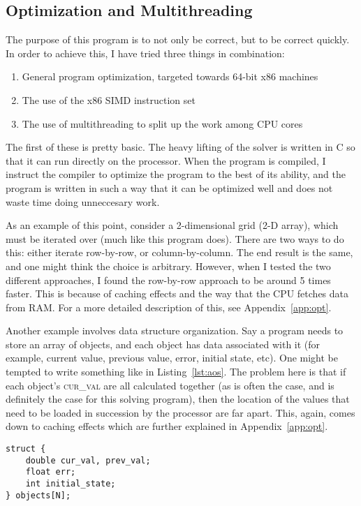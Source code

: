 \subsection{Optimization and Multithreading}
\label{sec:opt-mul}
The purpose of this program is to not only be correct, but to be correct quickly. In order to achieve this, I have
tried three things in combination:
\begin{enumerate}
\item General program optimization, targeted towards 64-bit x86 machines
\item The use of the x86 SIMD instruction set
\item The use of multithreading to split up the work among CPU cores
\end{enumerate}
The first of these is pretty basic. The heavy lifting of the solver is written in C so that it can run directly on the
processor. When the program is compiled, I instruct the compiler to optimize the program to the best of its ability,
and the program is written in such a way that it can be optimized well and does not waste time doing unneccesary work.

As an example of this point, consider a 2-dimensional grid (2-D array), which must be iterated over (much like
this program does). There are two ways to do this: either iterate row-by-row, or column-by-column. The end result is
the same, and one might think the choice is arbitrary. However, when I tested the two different approaches, I found
the row-by-row approach to be around 5 times faster. This is because of caching effects and the way that the CPU
fetches data from RAM\cite{intel-1}. For a more detailed description of this, see Appendix~\ref{app:opt}.

Another example involves data structure organization. Say a program needs to store an array of objects, and each object
has data associated with it (for example, current value, previous value, error, initial state, etc). One might be tempted
to write something like in Listing~\ref{lst:aos}. The problem here is that if each object's \textsc{cur\_val} are all
calculated together (as is often the case, and is definitely the case for this solving program), then the location of
the values that need to be loaded in succession by the processor are far apart. This, again, comes down to caching
effects which are further explained in Appendix~\ref{app:opt}.

\begin{minipage}{\linewidth}
\begin{lstlisting}[frame=single,label=lst:aos,caption={Array of structures organization.}]
struct {
	double cur_val, prev_val;
	float err;
	int initial_state;
} objects[N];
\end{lstlisting}
\end{minipage}

